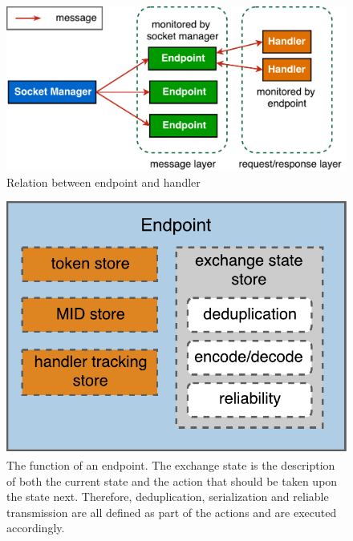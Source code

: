 \begin{figure}[!htbp]
\centering
\includegraphics[scale = 0.55]{coap_endpoint}
\caption{Relation between endpoint and handler}
\label{fig:coap_endpoint}
\end{figure}

\begin{figure}[!htbp]
\centering
\includegraphics[scale = 0.55]{coap_endpoint_inner}
\caption{The function of an endpoint. The exchange state is the description of both the current state and the action that should be taken upon the state next. Therefore, deduplication, serialization and reliable transmission are all defined as part of the actions and are executed accordingly.}
\label{fig:coap_endpoint_inner}
\end{figure}

